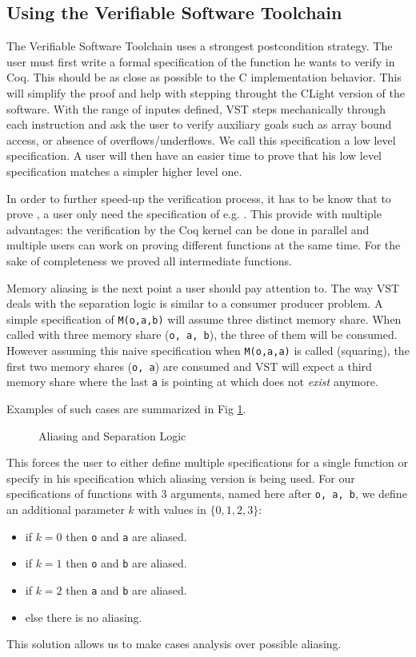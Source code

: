 \subsection{Using the Verifiable Software Toolchain}

The Verifiable Software Toolchain uses a strongest postcondition strategy.
The user must first write a formal specification of the function he wants to verify in Coq.
This should be as close as possible to the C implementation behavior.
This will simplify the proof and help with stepping throught the CLight version of the software.
With the range of inputes defined, VST steps mechanically through each instruction
and ask the user to verify auxiliary goals such as array bound access, or absence of overflows/underflows.
We call this specification a low level specification. A user will then have an easier
time to prove that his low level specification matches a simpler higher level one.

In order to further speed-up the verification process, it has to be know that to
prove , a user only need the specification of e.g. .
This provide with multiple advantages: the verification by the Coq kernel can be done
in parallel and multiple users can work on proving different functions at the same time.
For the sake of completeness we proved all intermediate functions.

Memory aliasing is the next point a user should pay attention to. The way VST
deals with the separation logic is similar to a consumer producer problem.
A simple specification of \texttt{M(o,a,b)} will assume three distinct memory share.
When called with three memory share (\texttt{o, a, b}), the three of them will be consumed.
However assuming this naive specification when \texttt{M(o,a,a)} is called (squaring),
the first two memory shares (\texttt{o, a}) are consumed and VST will expect a third
memory share where the last \texttt{a} is pointing at which does not \textit{exist} anymore.

Examples of such cases are summarized in Fig \ref{tk:MemSame}.
\begin{figure}[h]
  
  \caption{Aliasing and Separation Logic}
  \label{tk:MemSame}
\end{figure}

This forces the user to either define multiple specifications for a single function
or specify in his specification which aliasing version is being used.
For our specifications of functions with 3 arguments, named here after \texttt{o, a, b},
we define an additional parameter $k$ with values in
$\{0,1,2,3\}$:
\begin{itemize}
  \item if $k=0$ then \texttt{o} and \texttt{a} are aliased.
  \item if $k=1$ then \texttt{o} and \texttt{b} are aliased.
  \item if $k=2$ then \texttt{a} and \texttt{b} are aliased.
  \item else there is no aliasing.
\end{itemize}
This solution allows us to make cases analysis over possible aliasing.


